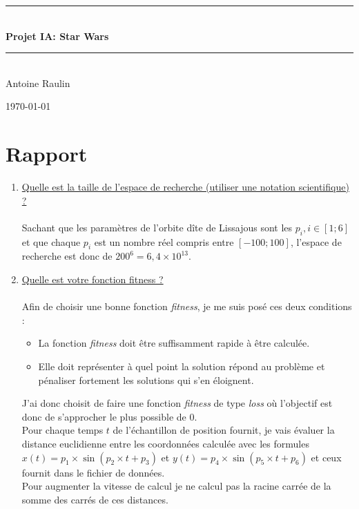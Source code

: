 \documentclass[11pt]{report}
\begin{document}
\begin{titlepage}
    \vspace*{\fill}

    \centering
	\rule{\linewidth}{0.2 mm} \\[0.4 cm]
	{ \huge \bfseries Projet IA: Star Wars}\\
	\rule{\linewidth}{0.2 mm} \\[1.5 cm]
	\LARGE Antoine Raulin
	
	\vspace*{\fill}
\footnotesize \today
\end{titlepage}
\newpage
\chapter*{Rapport}
\begin{enumerate}
    \item \underline{Quelle est la taille de l’espace de recherche (utiliser une notation scientifique) ?} \\ \\ Sachant que les paramètres de l'orbite dîte de Lissajous sont les $p_i, i \in [1;6]$ et que chaque $p_i$ est un nombre réel compris entre $[-100;100]$, l'espace de recherche est donc de $200^6=6,4\times10^{13}$. \\
    \item \underline{Quelle est votre fonction fitness ?} \\ \\ Afin de choisir une bonne fonction \textit{fitness}, je me suis posé ces deux conditions : \begin{itemize}
		\item La fonction \textit{fitness} doit être suffisamment rapide à être calculée.
		\item Elle doit représenter à quel point la solution répond au problème et pénaliser fortement les solutions qui s'en éloignent.
	\end{itemize}
	J'ai donc choisit de faire une fonction \textit{fitness} de type \textit{loss} où l'objectif est donc de s'approcher le plus possible de $0$. \\
	Pour chaque temps $t$ de l'échantillon de position fournit, je vais évaluer la distance euclidienne entre les coordonnées calculée avec les formules $x(t)=p_1\times \sin(p_2\times t+p_3)$ et $y(t)=p_4\times \sin (p_5 \times t + p_6)$ et ceux fournit dans le fichier de données. \\ Pour augmenter la vitesse de calcul je ne calcul pas la racine carrée de la somme des carrés de ces distances. \\

\end{enumerate}
\end{document}
